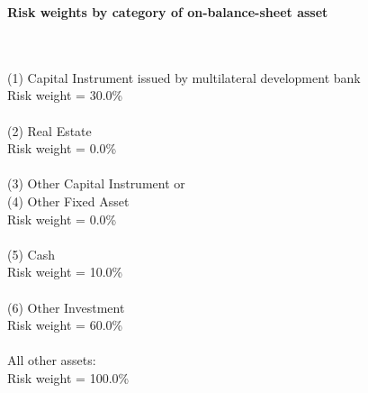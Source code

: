 \documentclass{article}
\begin{document}
\setlength{\parindent}{0em}
\begin{center}{\bf Risk weights by category of on-balance-sheet asset}\end{center}
~\\
~\\

(1) Capital Instrument issued by multilateral development bank \\
Risk weight = 30.0\%\\

~\\
(2) Real Estate\\
Risk weight = 0.0\%\\

~\\
(3) Other Capital Instrument or \\
(4) Other Fixed Asset\\
Risk weight = 0.0\%\\

~\\
(5) Cash  \\
Risk weight = 10.0\%\\

~\\
(6) Other Investment\\
Risk weight = 60.0\%\\

~\\
All other assets:\\
Risk weight = 100.0\%\\

~\\
\end{document}
